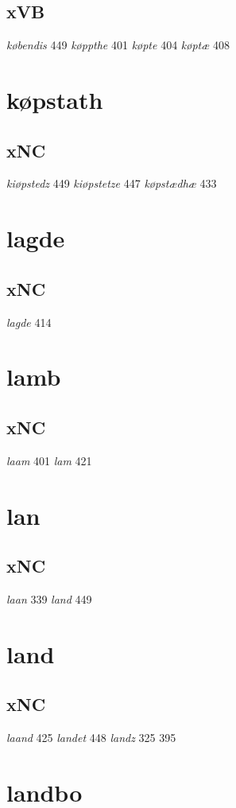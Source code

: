 \documentclass[a4paper,twocolumn]{article}
\begin{document}
\subsection{xVB}
\label{sec:orgfdb30d9}
\emph{købendis} 449 \emph{køppthe} 401 \emph{køpte} 404 \emph{køptæ} 408 
\section{køpstath}
\label{sec:orgd9e9f3e}
\subsection{xNC}
\label{sec:org48a276c}
\emph{kiøpstedz} 449 \emph{kiøpstetze} 447 \emph{køpstædhæ} 433 
\section{lagde}
\label{sec:orgca849b2}
\subsection{xNC}
\label{sec:org0b04c87}
\emph{lagde} 414 
\section{lamb}
\label{sec:org89ad2f0}
\subsection{xNC}
\label{sec:org3a41094}
\emph{laam} 401 \emph{lam} 421 
\section{lan}
\label{sec:org7e258bd}
\subsection{xNC}
\label{sec:orgc91246d}
\emph{laan} 339 \emph{land} 449 
\section{land}
\label{sec:org4bb65f7}
\subsection{xNC}
\label{sec:org8285209}
\emph{laand} 425 \emph{landet} 448 \emph{landz} 325 395 
\section{landbo}
\label{sec:org366036f}
\end{document}
